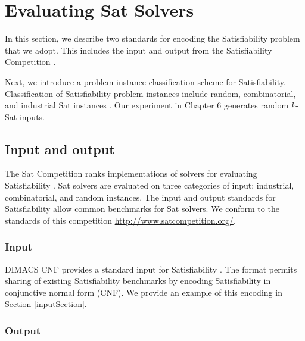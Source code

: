 \section{Evaluating {\sc Sat} Solvers}

	
	In this section, we describe two standards for encoding the {\sc Satisfiability} problem that we adopt.  This includes the input and output from the {\sc Satisfiability} Competition \cite{dimacsFormat, satcompetition}.  
	
	Next, we introduce a problem instance classification scheme for {\sc Satisfiability}.  Classification of {\sc Satisfiability} problem instances include random, combinatorial, and industrial {\sc Sat} instances \cite{satcompetition}.  Our experiment in Chapter 6 generates random $k$-{\sc Sat} inputs.

	\subsection{Input and output}
	
	
 The {\sc Sat} Competition ranks implementations of solvers for evaluating {\sc Satisfiability} \cite{satcompetition}.  {\sc Sat} solvers are evaluated on three categories of input: industrial, combinatorial, and random instances.  The input and output standards for {\sc Satisfiability} allow common benchmarks for {\sc Sat} solvers.  We conform to the standards of this competition \url{http://www.satcompetition.org/}.  
 

	
		\subsubsection{Input}
		
DIMACS CNF provides a standard input for {\sc Satisfiability} \cite{dimacsFormat}.  The format permits sharing of existing {\sc Satisfiability} benchmarks by encoding {\sc Satisfiability} in conjunctive normal form (CNF).  We provide an example of this encoding in Section \ref{inputSection}.
		
		\subsubsection{Output}
		
